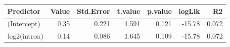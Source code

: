 \begin{table}[ht]
\centering
\begin{tabular}{lrrrrrr}
  \hline
Predictor & Value & Std.Error & t.value & p.value & logLik & R2 \\ 
  \hline
(Intercept) & 0.35 & 0.221 & 1.591 & 0.121 & -15.78 & 0.072 \\ 
  log2(intron) & 0.14 & 0.086 & 1.645 & 0.109 & -15.78 & 0.072 \\ 
   \hline
\end{tabular}
\end{table}
